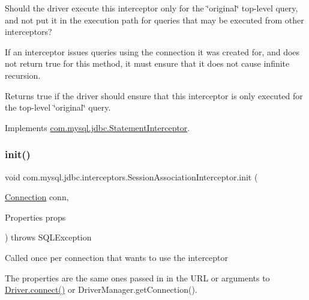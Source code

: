 Should the driver execute this interceptor only for the \char`\"{}original\char`\"{} top-\/level query, and not put it in the execution path for queries that may be executed from other interceptors?

If an interceptor issues queries using the connection it was created for, and does not return {\ttfamily true} for this method, it must ensure that it does not cause infinite recursion.

\begin{DoxyReturn}{Returns}
true if the driver should ensure that this interceptor is only executed for the top-\/level \char`\"{}original\char`\"{} query. 
\end{DoxyReturn}


Implements \mbox{\hyperlink{interfacecom_1_1mysql_1_1jdbc_1_1_statement_interceptor_a445950e1035a2519be9d5fbaf1fe1b8c}{com.\+mysql.\+jdbc.\+Statement\+Interceptor}}.

\mbox{\label{classcom_1_1mysql_1_1jdbc_1_1interceptors_1_1_session_association_interceptor_a525a3bac6a24ac0af33c1c1f1961f669}} 
\subsubsection{\texorpdfstring{init()}{init()}}
{\footnotesize\ttfamily void com.\+mysql.\+jdbc.\+interceptors.\+Session\+Association\+Interceptor.\+init (\begin{DoxyParamCaption}\item[{\mbox{\hyperlink{interfacecom_1_1mysql_1_1jdbc_1_1_connection}{Connection}}}]{conn,  }\item[{Properties}]{props }\end{DoxyParamCaption}) throws S\+Q\+L\+Exception}

Called once per connection that wants to use the interceptor

The properties are the same ones passed in in the U\+RL or arguments to \mbox{\hyperlink{classcom_1_1mysql_1_1jdbc_1_1_non_registering_driver_a834c012e752a01d1ee435b3461bb8218}{Driver.\+connect()}} or Driver\+Manager.\+get\+Connection().


